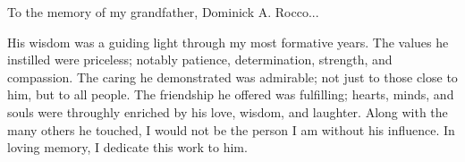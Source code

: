 To the memory of my grandfather, Dominick A. Rocco...

His wisdom was a guiding light through my most formative years.
The values he instilled were priceless; notably
patience, determination, strength, and compassion.
The caring he demonstrated was admirable; not just to those close to him,
but to all people.
The friendship he offered was fulfilling; hearts, minds, and souls
were throughly enriched by his love, wisdom, and laughter.
Along with the many others he touched, I would not be the person
I am without his influence.
In loving memory, I dedicate this work to him.
